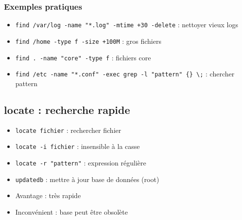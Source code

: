 \documentclass[12pt,a4paper]{article}
\begin{document}
\subsubsection{Exemples pratiques}
\begin{itemize}
    \item \texttt{find /var/log -name "*.log" -mtime +30 -delete} : nettoyer vieux logs %
    \item \texttt{find /home -type f -size +100M} : gros fichiers %
    \item \texttt{find . -name "core" -type f} : fichiers core %
    \item \texttt{find /etc -name "*.conf" -exec grep -l "pattern" \{\} \textbackslash;} : chercher pattern %
\end{itemize}


\subsection{locate : recherche rapide}
\begin{itemize}
    \item \texttt{locate fichier} : rechercher fichier %
    \item \texttt{locate -i fichier} : insensible \`a la casse %
    \item \texttt{locate -r "pattern"} : expression r\'eguli\`ere %
    \item \texttt{updatedb} : mettre \`a jour base de donn\'ees (root) %
    \item Avantage : tr\`es rapide %
    \item Inconv\'enient : base peut \^etre obsol\`ete %
\end{itemize}

\end{document}
